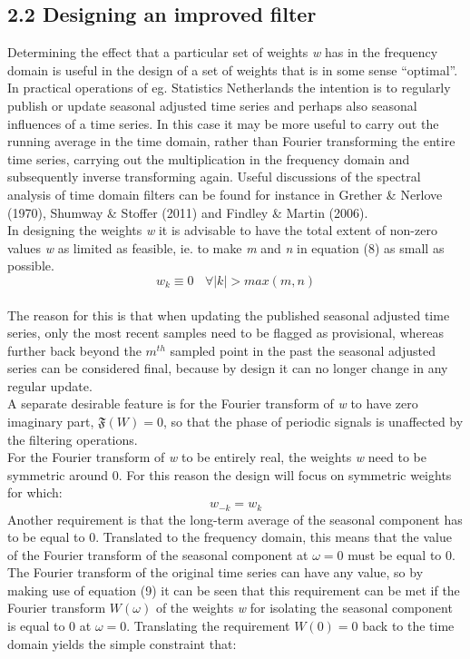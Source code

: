 \documentclass{article}
\begin{document}
\subsection*{\small 2.2 Designing an improved filter}
Determining the effect that a particular set of weights \textit{w} has in the frequency domain is useful in the design of a set of weights that is in some sense ``optimal''. In practical operations of eg. Statistics Netherlands the intention is to regularly publish or update seasonal adjusted time series and perhaps also seasonal influences of a time series. In this case it may be more useful to carry out the running average in the time domain, rather than Fourier transforming the entire time series, carrying out the multiplication in the frequency domain and subsequently inverse transforming again. Useful discussions of the spectral analysis of time domain filters can be found for instance in Grether \& Nerlove (1970), Shumway \& Stoffer (2011) and Findley \& Martin (2006).\\In designing the weights \textit{w} it is advisable  to have the total extent of non-zero values \textit{w} as limited as feasible, ie. to make \textit{m} and \textit{n} in equation (8) as small as possible.
\begin{equation}
w_k \equiv 0 \ \ \ \ \forall |k| > max(m,n)
\end{equation}
\\The reason for this is that when updating the published seasonal adjusted time series, only the most recent samples need to be flagged as provisional, whereas further back beyond the $m^{th}$ sampled point in the past the seasonal adjusted series can be considered final, because by design it can no longer change in any regular update.\\A separate desirable feature is for the Fourier transform of \textit{w} to have zero imaginary part, $\mathfrak{F}(W) = 0$, so that the phase of periodic signals is unaffected by the filtering operations.\\For the Fourier transform of \textit{w} to be entirely real, the weights \textit{w} need to be symmetric around 0. For this reason the design will focus on symmetric weights for which:
\begin{equation}
w_{-k} = w_k
\end{equation}
Another requirement is that the long-term average of the seasonal component has to be equal to 0. Translated to the frequency domain, this means that the value of the Fourier transform of the seasonal component at $\omega=0$ must be equal to 0. The Fourier transform of the original time series can have any value, so by making use of equation (9) it can be seen that this requirement can be met if the Fourier transform $W(\omega)$ of the weights \textit{w} for isolating the seasonal component is equal to 0 at $\omega=0$.  Translating the requirement $W(0)=0$ back to the time domain yields the simple constraint that:
\end{document}

